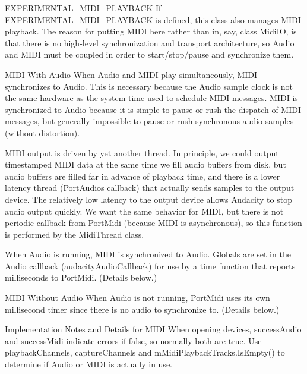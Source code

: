 \begin{DoxyParagraph}{E\+X\+P\+E\+R\+I\+M\+E\+N\+T\+A\+L\+\_\+\+M\+I\+D\+I\+\_\+\+P\+L\+A\+Y\+B\+A\+CK}
If E\+X\+P\+E\+R\+I\+M\+E\+N\+T\+A\+L\+\_\+\+M\+I\+D\+I\+\_\+\+P\+L\+A\+Y\+B\+A\+CK is defined, this class also manages M\+I\+DI playback. The reason for putting M\+I\+DI here rather than in, say, class Midi\+IO, is that there is no high-\/level synchronization and transport architecture, so Audio and M\+I\+DI must be coupled in order to start/stop/pause and synchronize them.
\end{DoxyParagraph}
\begin{DoxyParagraph}{M\+I\+DI With Audio}
When Audio and M\+I\+DI play simultaneously, M\+I\+DI synchronizes to Audio. This is necessary because the Audio sample clock is not the same hardware as the system time used to schedule M\+I\+DI messages. M\+I\+DI is synchronized to Audio because it is simple to pause or rush the dispatch of M\+I\+DI messages, but generally impossible to pause or rush synchronous audio samples (without distortion).
\end{DoxyParagraph}
\begin{DoxyParagraph}{}
M\+I\+DI output is driven by yet another thread. In principle, we could output timestamped M\+I\+DI data at the same time we fill audio buffers from disk, but audio buffers are filled far in advance of playback time, and there is a lower latency thread (Port\+Audio\textquotesingle{}s callback) that actually sends samples to the output device. The relatively low latency to the output device allows Audacity to stop audio output quickly. We want the same behavior for M\+I\+DI, but there is not periodic callback from Port\+Midi (because M\+I\+DI is asynchronous), so this function is performed by the Midi\+Thread class.
\end{DoxyParagraph}
\begin{DoxyParagraph}{}
When Audio is running, M\+I\+DI is synchronized to Audio. Globals are set in the Audio callback (audacity\+Audio\+Callback) for use by a time function that reports milliseconds to Port\+Midi. (Details below.)
\end{DoxyParagraph}
\begin{DoxyParagraph}{M\+I\+DI Without Audio}
When Audio is not running, Port\+Midi uses its own millisecond timer since there is no audio to synchronize to. (Details below.)
\end{DoxyParagraph}
\begin{DoxyParagraph}{Implementation Notes and Details for M\+I\+DI}
When opening devices, success\+Audio and success\+Midi indicate errors if false, so normally both are true. Use playback\+Channels, capture\+Channels and m\+Midi\+Playback\+Tracks.\+Is\+Empty() to determine if Audio or M\+I\+DI is actually in use.
\end{DoxyParagraph}
